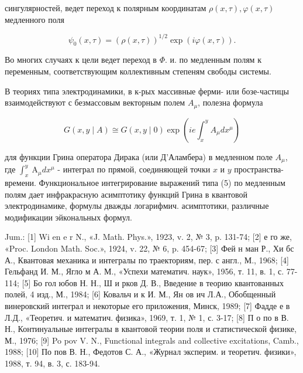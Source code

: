 \documentclass[10pt]{article}
\begin{document}
сингулярностей, ведет переход к полярным координатам $\rho(x, \tau), \varphi(x, \tau)$ медленного поля



\[

\psi_{0}(x, \tau)=(\rho(x, \tau))^{1 / 2} \exp (i \varphi(x, \tau)) .

\]



Во многих случаях к цели ведет переход в $\Phi$. и. по медленным полям к переменным, соответствующим коллективным степеням свободы системы.



В теориях типа электродинамики, в к-рых массивные ферми- или бозе-частицы взаимодействуют с безмассовым векторным полем $A_{\mu}$, полезна формула



\[

G(x, y \mid A) \cong G(x, y \mid 0) \exp \left(i e \int_{x}^{y} A_{\mu} d x^{\mu}\right)

\]



для функции Грина оператора Дирака (или Д'Аламбера) в медленном поле $A_{\mu}$, где $\int_{x}^{y} \mathrm{~A}_{\mu} d x^{\mu}$ - интеграл по прямой, соединяющей точки $x$ и $y$ пространства-времени. Функциональное интегрирование выражений типа (5) по медленным полям дает инфракрасную асимптотику функций Грина в квантовой электродинамике, формулы дважды логарифмич. асимптотики, различные модификации эйкональных формул.



Jum.: [1] Wi en e r N., «J. Math. Phys.», 1923, v. 2, № 3, p. 131-74; [2] е го же, «Proc. London Math. Soc.», 1924, v. 22, № 6, p. 454-67; [3] Фей н ман Р., Хи бс А., Квантовая механика и интегралы по траекториям, пер. с англ., М., 1968; [4] Гельфанд И. М., Ягло м А. М., «Успехи математич. наук», 1956, т. 11, в. 1, с. 77-114; [5] Бо гол юбов Н. Н., Ш и рков Д. В., Введение в теорию квантованных полей, 4 изд., М., 1984; [6] Ковальч и к И. М., Ян ов ич Л.А., Обобщенный винеровский интеграл и некоторые его приложения, Минск, 1989; [7] Фадде е в Л.Д., «Теоретич. и математич. физика», 1969, т. 1, № 1, с. 3-17; [8] П о по в В. Н., Континуальные интегралы в квантовой теории поля и статистической физике, М., 1976; [9] Po pov V. N., Functional integrals and collective excitations, Camb., 1988; [10] По пов В. Н., Федотов С. А., «Журнал эксперим. и теоретич. физики», 1988, т. 94, в. 3, с. 183-94.
\end{document}
